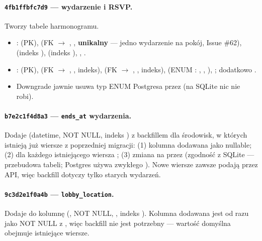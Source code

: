 \paragraph{\texttt{4fb1ffbfc7d9} --- wydarzenie i RSVP.} Tworzy tabele harmonogramu.
\begin{itemize}
  \item {}:  (PK),  (FK $\rightarrow$ ,
        , \textbf{unikalny} --- jedno wydarzenie na pokój, Issue
        \#62),  (indeks ), 
        (indeks ), , .
  \item {}:  (PK),  (FK $\rightarrow$
        , , indeks),  (FK
        $\rightarrow$ , , indeks), 
        (ENUM : , , ),
        ; dodatkowo .
  \item Downgrade jawnie usuwa typ ENUM Postgresa przez
         (na SQLite nic nie robi).
\end{itemize}

\paragraph{\texttt{b7e2c1f4d8a3} --- \texttt{ends\_at} wydarzenia.} Dodaje 
(datetime, NOT NULL, indeks ) z backfillem dla środowisk, w
których istnieją już wiersze z poprzedniej migracji: (1) kolumna dodawana jako nullable;
(2) dla każdego istniejącego wiersza ; (3) zmiana
na  przez  (zgodność z SQLite --- przebudowa
tabeli; Postgres używa zwykłego ). Nowe wiersze zawsze podają
 przez API, więc backfill dotyczy tylko starych wydarzeń.

\paragraph{\texttt{9c3d2e1f0a4b} --- \texttt{lobby\_location}.} Dodaje do 
kolumnę  (, NOT NULL, ,
indeks ). Kolumna dodawana jest od razu jako NOT NULL z
, więc backfill nie jest potrzebny --- wartość domyślna obejmuje
istniejące wiersze.

